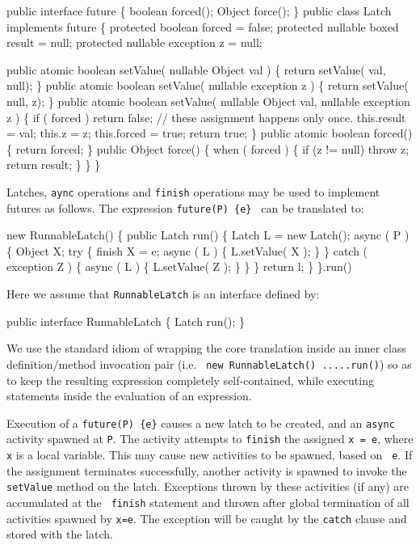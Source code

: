 \begin{x10}
public interface future \{
   boolean forced();
   Object force();
\}
public class Latch implements future \{
  protected boolean forced = false;
  protected nullable boxed result = null;
  protected nullable exception z = null;

  public atomic 
   boolean setValue( nullable Object val ) \{
   return setValue( val, null);
    \}
   public atomic 
   boolean setValue( nullable exception z ) \{
        return setValue( null, z);
    \}
    public atomic 
    boolean setValue( nullable Object val, 
                      nullable exception z ) \{
        if ( forced ) return false;
        // these assignment happens only once.
        this.result = val;
        this.z = z;
        this.forced = true;
        return true;
    \}
    public atomic boolean forced() \{
        return forced;
    \}
    public Object force() \{
        when ( forced ) \{
            if (z != null) throw z;
            return result;
        \}
    \}
\}
\end{x10}

Latches, {\tt aync} operations and {\tt finish} operations may be used
to implement futures as follows. The expression {\tt future(P) \{e\} }
can be translated to:
\begin{x10}
  new RunnableLatch() \{
      public Latch run() \{
         Latch L = new Latch();
         async ( P ) \{
            Object X;
            try \{
                finish X = e;
                async ( L ) \{
                   L.setValue( X ); 
                \}
            \} catch ( exception Z ) \{
               async ( L ) \{
                 L.setValue( Z );
               \}
            \}
         \}
         return l;
      \}
    \}.run()
\end{x10}

Here we assume that {\tt RunnableLatch} is an interface defined by:
\begin{x10} 
  public interface RunnableLatch \{
     Latch run();
  \}
\end{x10}

We use the standard \java{} idiom of wrapping the core translation
inside an inner class definition/method invocation pair (i.e.{} {\tt
new RunnableLatch() {....}.run()}) so as to keep the resulting
expression completely self-contained, while executing statements
inside the evaluation of an expression.

Execution of a {\tt future(P) \{e\}} causes a new latch to be created,
and an {\tt async} activity spawned at {\tt P}. The activity attempts
to {\tt finish} the assigned {\tt x = e}, where {\tt x} is a local
variable.  This may cause new activities to be spawned, based on {\tt
e}. If the assignment terminates successfully, another activity is
spawned to invoke the {\tt setValue} method on the latch.  Exceptions
thrown by these activities (if any) are accumulated at the {\tt
finish} statement and thrown after global termination of all
activities spawned by {\tt x=e}. The exception will be caught by the 
{\tt catch} clause and stored with the latch. 


